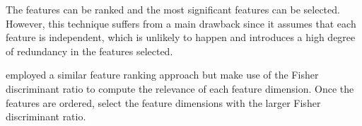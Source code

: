 %
%
The features can be ranked and the most significant features can be selected. However, this technique suffers from a main drawback since it assumes that each feature is independent, which is unlikely to happen and introduces a high degree of redundancy in the features selected.

\cite{Vos2012} employed a similar feature ranking approach but make use of the Fisher discriminant ratio to compute the relevance of each feature dimension. %
%
%
Once the features are ordered, \cite{Vos2012} select the feature dimensions with the larger Fisher discriminant ratio.

